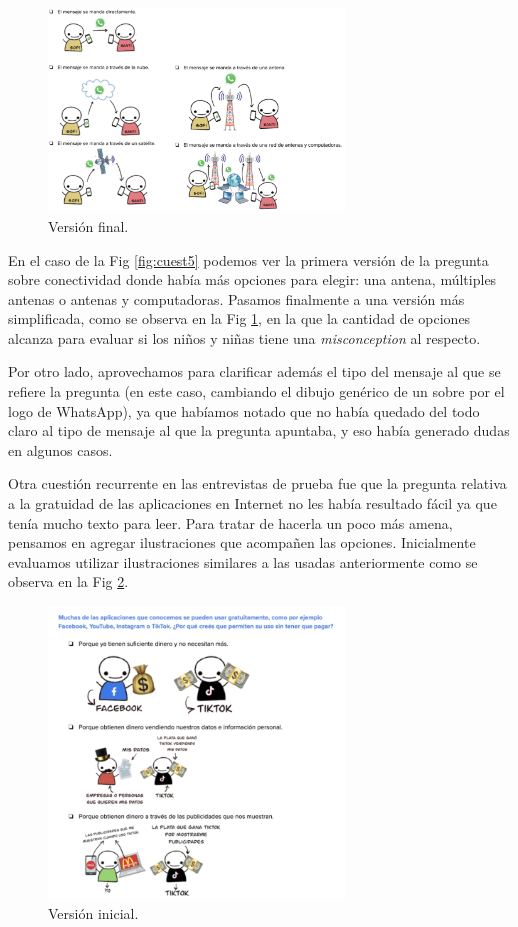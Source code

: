 \begin{figure}[h]
    \centering
    \includegraphics[width=0.7\textwidth]{images/6.png} 
    \caption{Versión final.}
    \label{fig:cuest6}
\end{figure}


En el caso de la Fig \ref{fig:cuest5} podemos ver la primera versión de la pregunta sobre conectividad donde había más opciones para elegir: una antena, múltiples antenas o antenas y computadoras. Pasamos finalmente a una versión más simplificada, como se observa en la Fig \ref{fig:cuest6}, en la que la cantidad de opciones alcanza para evaluar si los niños y niñas tiene una \textit{misconception} al respecto.

Por otro lado, aprovechamos para clarificar además el tipo del mensaje al que se refiere la pregunta (en este caso, cambiando el dibujo genérico de un sobre por el logo de WhatsApp), ya que habíamos notado que no había quedado del todo claro al tipo de mensaje al que la pregunta apuntaba, y eso había generado dudas en algunos casos. 

\newpage

Otra cuestión recurrente en las entrevistas de prueba fue que la pregunta relativa a la gratuidad de las aplicaciones en Internet no les había resultado fácil ya que tenía mucho texto para leer. Para tratar de hacerla un poco más amena, pensamos en agregar ilustraciones que acompañen las opciones. Inicialmente evaluamos utilizar ilustraciones similares a las usadas anteriormente como se observa en la Fig \ref{fig:cuest7}. 

\begin{figure}[h]
    \centering
    \includegraphics[width=0.7\textwidth]{images/7.png} 
    \caption{Versión inicial.}
    \label{fig:cuest7}
\end{figure}

